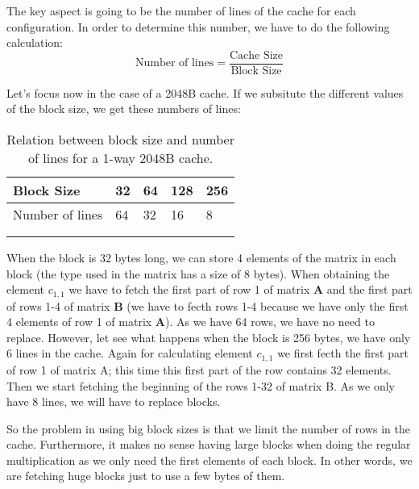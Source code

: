 \documentclass{article}
\begin{document}
The key aspect is going to be the number of lines of the cache for each configuration. In order to determine this number, we have to do the following calculation: 
\[
\text{Number of lines} = \frac{\text{Cache Size}}{\text{Block Size}}
\]

Let's focus now in the case of a 2048B cache. If we subsitute the different values of the block size, we get these numbers of lines:

{
\begin{table}[!ht]
    \centering
    \begin{tabular}{lllll}
    \hline
    \multicolumn{1}{|l|}{Block Size}      & \multicolumn{1}{l|}{32} & \multicolumn{1}{l|}{64} & \multicolumn{1}{l|}{128} & \multicolumn{1}{l|}{256} \\ \hline
    \multicolumn{1}{|l|}{Number of lines} & \multicolumn{1}{l|}{64} & \multicolumn{1}{l|}{32} & \multicolumn{1}{l|}{16}  & \multicolumn{1}{l|}{8}   \\ \hline
                                          &                         &                         &                          &                          \\
                                          &                         &                         &                          &                         
    \end{tabular}
    \caption{\label{tab:table-name}Relation between block size and number of lines for a 1-way 2048B cache.}
\end{table}
}


When the block is 32 bytes long, we can store 4 elements of the matrix in each block (the type used in the matrix has a size of 8 bytes). When obtaining the element $c_{1,1}$ we have to fetch the first part of row 1 of matrix $\mathbf{A}$ and the first part of rows 1-4 of matrix $\mathbf{B}$ (we have to fecth rows 1-4 because we have only the first 4 elements of row 1 of matrix $\mathbf{A}$). As we have 64 rows, we have no need to replace. However, let see what happens when the block is 256 bytes, we have only 6 lines in the cache. Again for calculating element $c_{1,1}$ we first fecth the first part of row 1 of matrix A; this time this first part of the row contains 32 elements. Then we start fetching the beginning of the rows 1-32 of matrix B. As we only have 8 lines, we will have to replace blocks. 

So the problem in using big block sizes is that we limit the number of rows in the cache. Furthermore, it makes no sense having large blocks when doing the regular multiplication as we only need the first elements of each block. In other words, we are fetching huge blocks just to use a few bytes of them.
\end{document}
